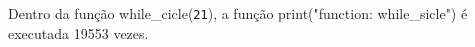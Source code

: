 \documentclass[12pt,varwidth=16cm,border=1pt]{standalone}
\begin{document}
Dentro da função while\_cicle(\verb+21+), a função print("function: while\_sicle") é executada 19553 vezes.

\questiomfalse
\end{document}
